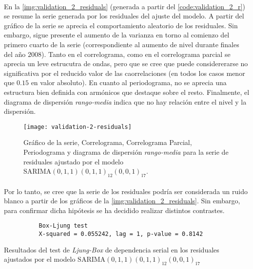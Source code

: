 \documentclass[a4paper, spanish]{article}
\begin{document}
      \paragraph{}
      En la \autoref{img:validation_2_residuals} (generada a partir del \autoref{code:validation_2_r}) se resume la serie generada por los residuales del ajuste del modelo. A partir del gráfico de la serie se aprecia el comportamiento aleatorio de los residuales. Sin embargo, sigue presente el aumento de la varianza en torno al comienzo del primero cuarto de la serie (correspondiente al aumento de nivel durante finales del año $2008$). Tanto en el correlograma, como en el correlograma parcial se aprecia un leve estrucutra de ondas, pero que se cree que puede considererarse no significativa por el reducido valor de las caorrelaciones (en todos los casos menor que $0.15$ en valor absoluto). En cuanto al periodograma, no se aprecia una estructura bien definida con armónicos que destaque sobre el resto. Finalmente, el diagrama de dispersión \emph{rango-media} indica que no hay relación entre el nivel y la dispersión.

      \begin{figure}[htb!]
        \centering
        \texttt{[image: validation-2-residuals]}
        \caption{Gráfico de la serie, Correlograma, Correlograma Parcial, Periodograma y diagrama de dispersión \emph{rango-media} para la serie de residuales ajustado por el modelo $\text{SARIMA}(0, 1, 1)(0, 1, 1)_{12}(0, 0, 1)_{17}$.}
        \label{img:validation_2_residuals}
      \end{figure}

      \paragraph{}
      Por lo tanto, se cree que la serie de los residuales podría ser considerada un ruido blanco a partir de los gráficos de la \autoref{img:validation_2_residuals}. Sin embargo, para confirmar dicha hipótesis se ha decidido realizar distintos contrastes.

      \begin{table}[htb!]
        \begin{Verbatim}
          Box-Ljung test
          X-squared = 0.055242, lag = 1, p-value = 0.8142
        \end{Verbatim}
        \caption{Resultados del test de \emph{Ljung-Box} de dependencia serial en los residuales ajustados por el modelo $\text{SARIMA}(0, 1, 1)(0, 1, 1)_{12}(0, 0, 1)_{17}$}
        \label{result:validation_2_ljung_box_1}
      \end{table}
\end{document}
